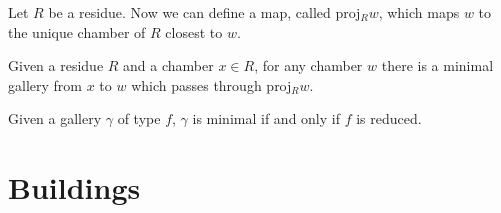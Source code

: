 \documentclass[11pt]{article}
\begin{document}
Let $R$ be a residue. Now we can define a map, called proj$_Rw$, which maps $w$ to the unique chamber of $R$ closest to $w$. 


\begin{proposition}
    Given a residue $R$ and a chamber $x\in R$, for any chamber $w$ there is a minimal gallery from $x$ to $w$ which passes through proj$_Rw$. 
\end{proposition}


\begin{theorem}
    Given a gallery $\gamma$ of type $f$, $\gamma$ is minimal if and only if $f$ is reduced.
\end{theorem}







\section{Buildings}\label{4}
\end{document}
